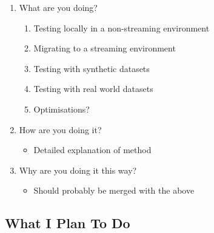 \begin{enumerate}
    \item What are you doing?
    \begin{enumerate}
        \item Testing locally in a non-streaming environment
        \item Migrating to a streaming environment
        \item Testing with synthetic datasets
        \item Testing with real world datasets
        \item Optimisations?
    \end{enumerate}
    \item How are you doing it?
    \begin{itemize}
        \item Detailed explanation of method
    \end{itemize}
    \item Why are you doing it this way?
    \begin{itemize}
        \item Should probably be merged with the above
    \end{itemize}
\end{enumerate}

\subsection{What I Plan To Do}

